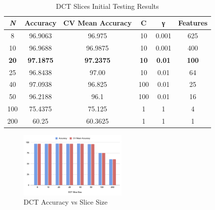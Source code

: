 \documentclass{icsthesis}
\begin{document}
\begin{mainmatter}
\\
\begin{table}[H]
\centering
\begin{tabular}{|c|c|c|c|c|c|}
\hline
\textit{\textbf{N}} & Accuracy         & CV Mean Accuracy & C           & γ             & Features     \\ \hline
8                   & 96.9063          & 96.975           & 10          & 0.001         & 625          \\ \hline
10                  & 96.9688          & 96.9875          & 10          & 0.001         & 400          \\ \hline
\textbf{20}                  & \textbf{97.1875} & \textbf{97.2375} & \textbf{10} & \textbf{0.01} & \textbf{100} \\ \hline
25                  & 96.8438          & 97.00            & 10          & 0.01          & 64           \\ \hline
40                  & 97.0938          & 96.825           & 100         & 0.01          & 25           \\ \hline
50                  & 96.2188          & 96.1             & 100         & 0.01          & 16           \\ \hline
100                 & 75.4375          & 75.125           & 1           & 1             & 4            \\ \hline
200                 & 60.25            & 60.3625          & 1           & 1             & 1            \\ \hline
\end{tabular}
\caption{DCT Slices Initial Testing Results}
\end{table}

\begin{figure}[ht]
    \centering
   \vspace{4ex}
	\includegraphics[width=200px]{imgs/Acc_slize.png}
    \caption{DCT Accuracy vs Slice Size}
    \label{fig:enter-label}
\end{figure}



\end{mainmatter}
\end{document}
